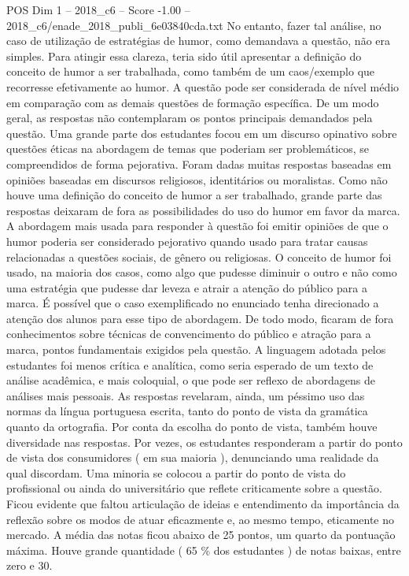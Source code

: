 \begin{textsample}{POS Dim 1 – 2018\_c6 – Score -1.00 – 2018\_c6/enade\_2018\_publi\_6e03840cda.txt}
No entanto, fazer tal análise, no caso de utilização de estratégias de humor, como demandava a questão, não era simples.
Para atingir essa clareza, teria sido útil apresentar a definição do conceito de humor a ser trabalhada, como também de um caos/exemplo que recorresse efetivamente ao humor.
A questão pode ser considerada de nível médio em comparação com as demais questões de formação específica.
De um modo geral, as respostas não contemplaram os pontos principais demandados pela questão.
Uma grande parte dos estudantes focou em um discurso opinativo sobre questões éticas na abordagem de temas que poderiam ser problemáticos, se compreendidos de forma pejorativa.
Foram dadas muitas respostas baseadas em opiniões baseadas em discursos religiosos, identitários ou moralistas.
Como não houve uma definição do conceito de humor a ser trabalhado, grande parte das respostas deixaram de fora as possibilidades do uso do humor em favor da marca.
A abordagem mais usada para responder à questão foi emitir opiniões de que o humor poderia ser considerado pejorativo quando usado para tratar causas relacionadas a questões sociais, de gênero ou religiosas.
O conceito de humor foi usado, na maioria dos casos, como algo que pudesse diminuir o outro e não como uma estratégia que pudesse dar leveza e atrair a atenção do público para a marca.
É possível que o caso exemplificado no enunciado tenha direcionado a atenção dos alunos para esse tipo de abordagem.
De todo modo, ficaram de fora conhecimentos sobre técnicas de convencimento do público e atração para a marca, pontos fundamentais exigidos pela questão.
A linguagem adotada pelos estudantes foi menos crítica e analítica, como seria esperado de um texto de análise acadêmica, e mais coloquial, o que pode ser reflexo de abordagens de análises mais pessoais.
As respostas revelaram, ainda, um péssimo uso das normas da língua portuguesa escrita, tanto do ponto de vista da gramática quanto da ortografia.
Por conta da escolha do ponto de vista, também houve diversidade nas respostas.
Por vezes, os estudantes responderam a partir do ponto de vista dos consumidores ( em sua maioria ), denunciando uma realidade da qual discordam.
Uma minoria se colocou a partir do ponto de vista do profissional ou ainda do universitário que reflete criticamente sobre a questão.
Ficou evidente que faltou articulação de ideias e entendimento da importância da reflexão sobre os modos de atuar eficazmente e, ao mesmo tempo, eticamente no mercado.
A média das notas ficou abaixo de 25 pontos, um quarto da pontuação máxima.
Houve grande quantidade ( 65 \% dos estudantes ) de notas baixas, entre zero e 30.

\end{textsample}
